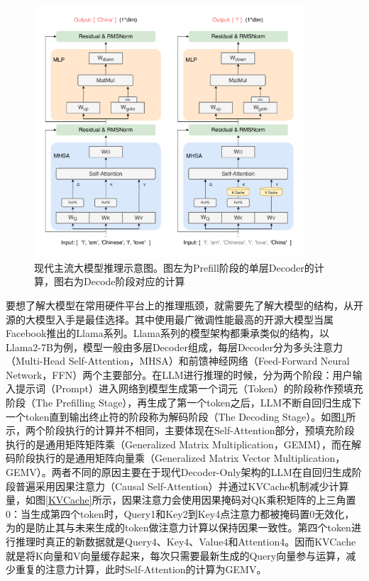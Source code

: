 \begin{figure}[!htbp]
	\centering
    \includegraphics[width=0.9\textwidth]{figures/LLMInfer.pdf}
	\caption{现代主流大模型推理示意图。图左为Prefill阶段的单层Decoder的计算，图右为Decode阶段对应的计算}
    \label{LLMInfer}
\end{figure}

要想了解大模型在常用硬件平台上的推理瓶颈，就需要先了解大模型的结构，从开源的大模型入手是最佳选择。其中使用最广微调性能最高的开源大模型当属Facebook推出的Llama系列。Llama系列的模型架构都秉承类似的结构，以Llama2-7B\cite{Llama2}为例，模型一般由多层Decoder组成，每层Decoder分为多头注意力（Multi-Head Self-Attention，MHSA）和前馈神经网络（Feed-Forward Neural Network，FFN）两个主要部分。在LLM进行推理的时候，分为两个阶段：用户输入提示词（Prompt）进入网络到模型生成第一个词元（Token）的阶段称作预填充阶段（The Prefilling Stage），再生成了第一个token之后，LLM不断自回归生成下一个token直到输出终止符的阶段称为解码阶段（The Decoding Stage）。如图\ref{LLMInfer}所示，两个阶段执行的计算并不相同，主要体现在Self-Attention部分，预填充阶段执行的是通用矩阵矩阵乘（Generalized Matrix Multiplication，GEMM），而在解码阶段执行的是通用矩阵向量乘（Generalized Matrix Vector Multiplication，GEMV）。两者不同的原因主要在于现代Decoder-Only架构的LLM在自回归生成阶段普遍采用因果注意力（Causal Self-Attention）并通过KVCache机制减少计算量，如图\ref{KVCache}所示，因果注意力会使用因果掩码对QK乘积矩阵的上三角置0：当生成第四个token时，Query1和Key2到Key4点注意力都被掩码置0无效化，为的是防止其与未来生成的token做注意力计算以保持因果一致性。第四个token进行推理时真正的新数据就是Query4、Key4、Value4和Attention4。因而KVCache就是将K向量和V向量缓存起来，每次只需要最新生成的Query向量参与运算，减少重复的注意力计算，此时Self-Attention的计算为GEMV。

